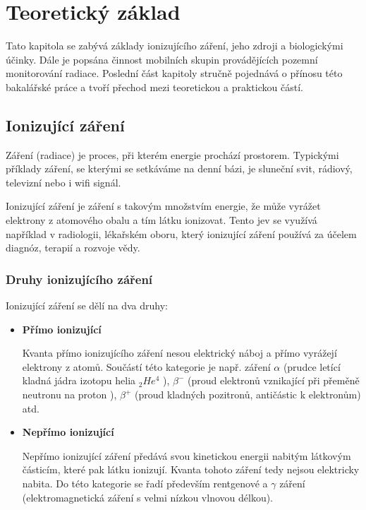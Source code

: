 \chapter{Teoretický základ}
\label{2-teorie}
Tato kapitola se zabývá základy ionizujícího záření, jeho zdroji a biologickými účinky. Dále je popsána činnost mobilních skupin provádějících pozemní monitorování radiace. Poslední část kapitoly stručně pojednává o přínosu této bakalářské práce a tvoří přechod mezi teoretickou a praktickou částí.

\section{Ionizující záření}
	
Záření (radiace) je proces, při kterém energie prochází prostorem. Typickými příklady záření, se kterými se setkáváme na denní bázi, je sluneční svit, rádiový, televizní nebo i wifi signál. %


Ionizující záření je záření s takovým množstvím energie, že může vyrážet elektrony z atomového obalu a tím látku ionizovat. Tento jev se využívá například v radiologii, lékařském oboru, který ionizující záření používá za účelem diagnóz, terapií a rozvoje vědy. %

\subsection{Druhy ionizujícího záření} %
Ionizující záření se dělí na dva druhy:

\begin{itemize}
	\item \textbf{Přímo ionizující}
	
		Kvanta přímo ionizujícího záření nesou elektrický náboj a přímo vyrážejí elektrony z atomů. Součástí této kategorie je např. záření $\alpha$ (prudce letící kladná jádra izotopu helia $_{2}He^{4}$ %
		), $\beta^{-}$ (proud elektronů vznikající při přeměně neutronu na proton %
		), $\beta^{+}$ (proud kladných pozitronů, antičástic k elektronům) %
		 atd.
		 
	\item \textbf{Nepřímo ionizující}
	
		Nepřímo ionizující záření předává svou kinetickou energii nabitým látkovým částicím, které pak látku ionizují. Kvanta tohoto záření tedy nejsou elektricky nabita. Do této kategorie se řadí především rentgenové a $\gamma$ záření (elektromagnetická záření s velmi nízkou vlnovou délkou). %
\end{itemize}

